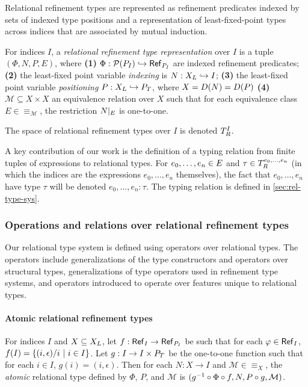 Relational refinement types are represented as refinement predicates
indexed by sets of indexed type positions and a representation of
least-fixed-point types across indices that are associated by mutual
induction.
%
\begin{defn}
  \label{defn:rel-type-rep}
  For indices $I$, a \emph{relational refinement type representation}
  over $I$ is a tuple $(\Phi, N, P, E)$, where
  \textbf{(1)}
  $\Phi : \mathcal{P}(P_{I}) \hookrightarrow \mathsf{Ref}_{ P_{I} }$ are indexed
  refinement predicates;
  \textbf{(2)} the least-fixed point variable \emph{indexing} is
  $N : X_L \hookrightarrow I$;
  \textbf{(3)} the least-fixed point variable \emph{positioning}
  $P : X_L \hookrightarrow P_T$, where $X = D(N) = D(P)$
  \textbf{(4)} $\mathcal{M} \subseteq X \times X$ an equivalence
  relation over $X$ such that for each equivalence class
  $E \in \equiv_{\mathcal{M}}$, the restriction $N|_{E}$ is
  one-to-one.
\end{defn}
%
The space of relational refinement types over $I$ is denoted
$T_{R}^{I}$.

A key contribution of our work is the definition of a typing relation
from finite tuples of expressions to relational types.
%
For $e_0, \ldots, e_n \in E$ and
$\tau \in T_{R}^{e_0, \ldots, e_n}$ (in which the indices are the
expressions $e_0, \ldots, e_n$ themselves), the fact that
$e_0, \ldots, e_n$ have type $\tau$ will be denoted
$e_0, \ldots, e_n : \tau$.
%
The typing relation is defined in \autoref{sec:rel-type-sys}.

\subsubsection{Operations and relations over relational refinement types}
\label{sec:rel-type-ops}
Our relational type system is defined using operators over relational
types.
%
The operators include generalizations of the type constructors and
operators over structural types, generalizations of type operators
used in refinement type systems, and operators introduced to operate
over features unique to relational types.

\paragraph{Atomic relational refinement types}
%
For indices $I$ and $X \subseteq X_L$, let
$f : \mathsf{Ref}_{I} \to \mathsf{Ref}_{P_{I} }$ be such that for each
$\varphi \in \mathsf{Ref}_{I}$,
$f(I) = \{  (i, \epsilon) / i \ |\  i \in I  \}$.
%
Let $g : I \to I \times P_T$ be the one-to-one function such that
for each $i \in I$, $g(i) = (i, \epsilon)$.
%
Then for each $N : X \to I$ and $\mathcal{M} \in \equiv_X$, the
\emph{atomic} relational type defined by $\Phi$, $P$, and
$\mathcal{M}$ is
$(g^{-1} \circ \Phi \circ f, N, P \circ g, \mathcal{M})$.

